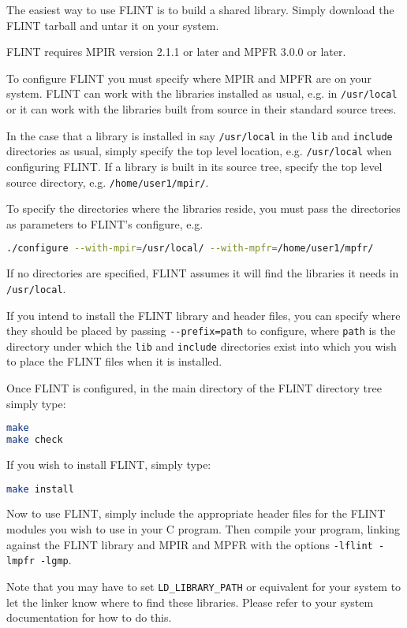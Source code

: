 \documentclass[a4paper,10pt]{book}
\newcommand{\code}{\lstinline}
\begin{document}
The easiest way to use FLINT is to build a shared library.  Simply download 
the FLINT tarball and untar it on your system.

FLINT requires MPIR version 2.1.1 or later and MPFR 3.0.0 or later.

To configure FLINT you must specify where MPIR and MPFR are on
your system. FLINT can work with the libraries installed as usual,
e.g. in \code{/usr/local} or it can work with the libraries built
from source in their standard source trees. 

In the case that a library is installed in say \code{/usr/local}
in the \code{lib} and \code{include} directories as usual, simply
specify the top level location, e.g. \code{/usr/local} when 
configuring FLINT. If a library is built in its source tree,
specify the top level source directory, e.g. \code{/home/user1/mpir/}.

To specify the directories where the libraries reside, you must
pass the directories as parameters to FLINT's configure, e.g.\ 
\begin{lstlisting}[language=bash]
./configure --with-mpir=/usr/local/ --with-mpfr=/home/user1/mpfr/
\end{lstlisting}
If no directories are specified, FLINT assumes it will find the
libraries it needs in \code{/usr/local}.

If you intend to install the FLINT library and header files, 
you can specify where they should be placed by passing 
\code{--prefix=path} to configure, where \code{path} is the directory
under which the \code{lib} and \code{include} directories exist into
which you wish to place the FLINT files when it is installed.

Once FLINT is configured, in the main directory of the FLINT directory 
tree simply type:
\begin{lstlisting}[language=bash]
make
make check
\end{lstlisting}

If you wish to install FLINT, simply type:
\begin{lstlisting}[language=bash]
make install
\end{lstlisting}

Now to use FLINT, simply include the appropriate header files for 
the FLINT modules you wish to use in your C program.  Then compile 
your program, linking against the FLINT library and MPIR and MPFR 
with the options \code{-lflint -lmpfr -lgmp}.

Note that you may have to set \code{LD_LIBRARY_PATH} or equivalent
for your system to let the linker know where to find these libraries.
Please refer to your system documentation for how to do this.
\end{document}
